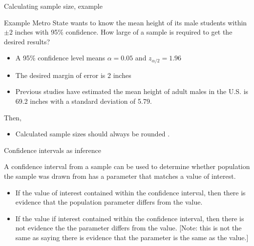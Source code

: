 \documentclass[xcolor=table, aspectratio=169, bigger, handout]{beamer}
\begin{document}
\begin{frame}{Calculating sample size, example}
\begin{exampleblock}{Example}
Metro State wants to know the mean height of its male students within $\pm 2$ inches with 95\% confidence. How large of a sample is required to get the desired results? \\ \smallskip

\begin{itemize}
\pause\item A 95\% confidence level means $\alpha = 0.05$ and $z_{\alpha/2} = 1.96$

\pause\item The desired margin of error is 2 inches

\pause\item Previous studies have estimated the mean height of adult males in the U.S. is 69.2 inches with a standard deviation of 5.79.
\end{itemize}

\pause Then, \\ \smallskip
{} \smallskip

\begin{itemize}
\pause\item Calculated sample sizes should always be rounded .
\end{itemize}
\end{exampleblock}
\end{frame}

\begin{frame}{Confidence intervals as inference}
\begin{block}{}
A confidence interval from a sample can be used to determine whether population the sample was drawn from has a parameter that  matches a value of interest.
\begin{itemize}
\pause\item If the value of interest  contained within the confidence interval, then there is evidence that the population parameter differs from the value.

\pause\item If the value if interest  contained within the confidence interval, then there is not evidence the the parameter differs from the value. [Note: this is not the same as saying there is evidence that the parameter is the same as the value.]
\end{itemize} 
\end{block}
\end{frame}
\end{document}
